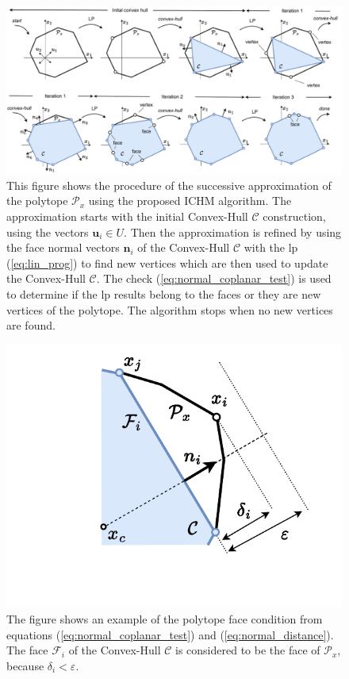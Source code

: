 \begin{figure}[!t]
    \centering
    \includegraphics[width=\linewidth]{Papers/images/ichm_full.pdf}
    \vspace{-0.8cm}
    \caption{This figure shows the procedure of the successive approximation of the polytope $\mathcal{P}_x$ using the proposed ICHM algorithm. The approximation starts with the initial Convex-Hull $\mathcal{C}$ construction, using the vectors $\bm{u}_i\in U$. Then the approximation is refined by using the face normal vectors $\bm{n}_i$ of the Convex-Hull $\mathcal{C}$ with the \gls{lp} (\ref{eq:lin_prog}) to find new vertices which are then used to update the Convex-Hull $\mathcal{C}$. The check (\ref{eq:normal_coplanar_test}) is used to determine if the \gls{lp} results belong to the faces or they are new vertices of the polytope. The algorithm stops when no new vertices are found. }
    \label{fig:algo_example}
\end{figure}


\begin{figure}
\vspace{-1.5cm}
    \centering
    \includegraphics[trim=2.5cm 2cm 0 0,clip=true,width=\linewidth]{Papers/images/espilon_explicaiton.pdf}
    \caption{ The figure shows an example of the polytope face condition from equations (\ref{eq:normal_coplanar_test}) and (\ref{eq:normal_distance}). The face $\mathcal{F}_i$ of the Convex-Hull $\mathcal{C}$ is considered to be the face of $\mathcal{P}_x$, because $\delta_i\! < \!\varepsilon$. }
    \label{fig:expilon_explication}
\end{figure}
